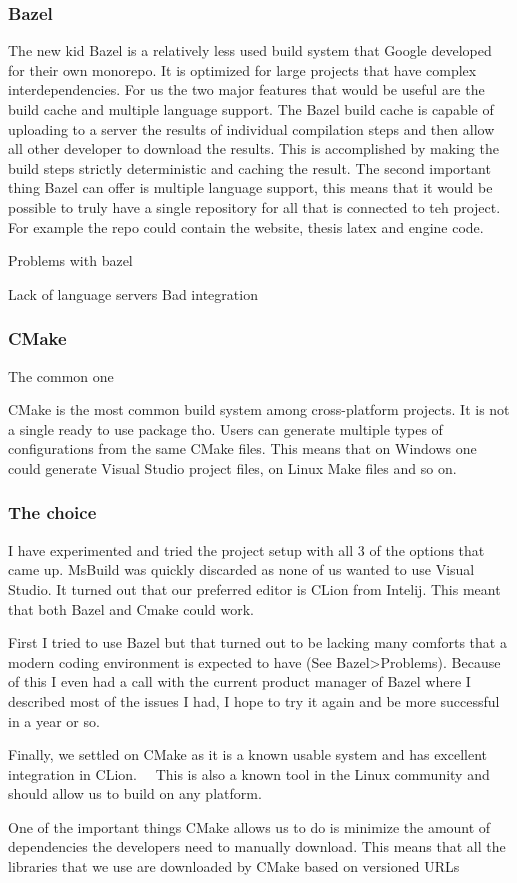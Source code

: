 \subsubsection{Bazel}
The new kid
Bazel is a relatively less used build system that Google developed for their own monorepo.
It is optimized for large projects that have complex interdependencies.
For us the two major features that would be useful are the build cache and multiple language support.
The Bazel build cache is capable of uploading to a server the results of individual compilation steps and then allow all other developer to download the results.
This is accomplished by making the build steps strictly deterministic and caching the result.
The second important thing Bazel can offer is multiple language support,
this means that it would be possible to truly have a single repository for all that is connected to teh project.
For example the repo could contain the website, thesis latex and engine code.

Problems with bazel

Lack of language servers
Bad integration

\subsubsection{CMake}
The common one

CMake is the most common build system among cross-platform projects.
It is not a single ready to use package tho.
Users can generate multiple types of configurations from the same CMake files.
This means that on Windows one could generate Visual Studio project files, on Linux Make files and so on.

\subsubsection{The choice}
I have experimented and tried the project setup with all 3 of the options that came up.
MsBuild was quickly discarded as none of us wanted to use Visual Studio.
It turned out that our preferred editor is CLion from Intelij.
This meant that both Bazel and Cmake could work.

First I tried to use Bazel but that turned out to be lacking many comforts that a modern coding environment is expected to have (See Bazel>Problems).
Because of this I even had a call with the current product manager of Bazel where I described most of the issues I had, I hope to try it again and be more successful in a year or so.

Finally, we settled on CMake as it is a known usable system and has excellent integration in CLion.
~~This is also a known tool in the Linux community and should allow us to build on any platform.~~

One of the important things CMake allows us to do is minimize the amount of dependencies the developers need to manually download.
This means that all the libraries that we use are downloaded by CMake based on versioned URLs
